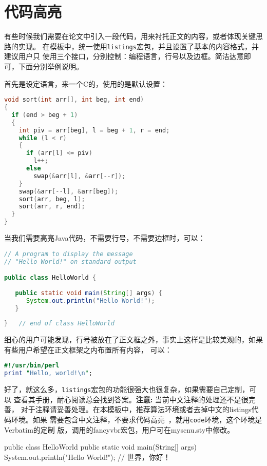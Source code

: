 \section{代码高亮}
有些时候我们需要在论文中引入一段代码，用来衬托正文的内容，或者体现关键思路的实现。
在模板中，统一使用\texttt{listings}宏包，并且设置了基本的内容格式，并建议用户只
使用三个接口，分别控制：编程语言，行号以及边框。简洁达意即可，下面分别举例说明。

首先是设定语言，来一个C的，使用的是默认设置：
\begin{lstlisting}[language=C]
void sort(int arr[], int beg, int end)
{
  if (end > beg + 1)
  {
    int piv = arr[beg], l = beg + 1, r = end;
    while (l < r)
    {
      if (arr[l] <= piv)
        l++;
      else
        swap(&arr[l], &arr[--r]);
    }
    swap(&arr[--l], &arr[beg]);
    sort(arr, beg, l);
    sort(arr, r, end);
  }
}
\end{lstlisting}

当我们需要高亮Java代码，不需要行号，不需要边框时，可以：
\begin{lstlisting}[language=Java,numbers=none,frame=none]
// A program to display the message
// "Hello World!" on standard output

public class HelloWorld {
 
   public static void main(String[] args) {
      System.out.println("Hello World!");
   }
      
}   // end of class HelloWorld
\end{lstlisting}

细心的用户可能发现，行号被放在了正文框之外，事实上这样是比较美观的，如果有些用户希望在正文框架之内布置所有内容，
可以：
\begin{lstlisting}[language=perl,xleftmargin=2em,framexleftmargin=1.5em]
#!/usr/bin/perl
print "Hello, world!\n";
\end{lstlisting}

好了，就这么多，\texttt{listings}宏包的功能很强大也很复杂，如果需要自己定制，可以
查看其手册，耐心阅读总会找到答案。\textbf{注意:} 当前中文注释的处理还不是很完善，
对于注释请妥善处理。在本模板中，推荐算法环境或者去掉中文的listings代码环境。如果
需要包含中文注释，不要求代码高亮~，就用\texttt{code}环境，这个环境是Verbatim的定制
版，调用的fancyvbr宏包，用户可在myscnu.sty中修改。

\begin{code}
public class HelloWorld {
   public static void main(String[] args) {
      System.out.println("Hello World!");
   }
}   // 世界，你好！
\end{code}

